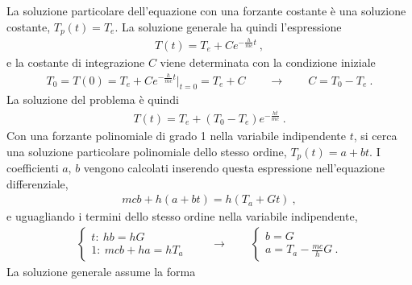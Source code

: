 \documentclass[letterpaper,10pt,italian]{jupyterBook}
\begin{document}
\sphinxAtStartPar
{} La soluzione particolare dell’equazione con una forzante costante è una soluzione costante, \(T_p(t) = T_e\). La soluzione generale ha quindi l’espressione
\begin{equation*}
\begin{split} T(t) = T_e + C e^{-\frac{h}{mc}t} \ ,\end{split}
\end{equation*}
\sphinxAtStartPar
e la costante di integrazione \(C\) viene determinata con la condizione iniziale
\begin{equation*}
\begin{split}T_0 = T(0) = T_e + C e^{-\frac{h}{mc}t} \big|_{t=0} = T_e + C \qquad \rightarrow \qquad C = T_0 - T_e \ .\end{split}
\end{equation*}
\sphinxAtStartPar
La soluzione del problema è quindi
\begin{equation*}
\begin{split}
  T(t) = T_e + ( T_0 - T_e )  e^{-\frac{ht}{mc}} \ .
\end{split}
\end{equation*}
\sphinxAtStartPar
{} Con una forzante polinomiale di grado 1 nella variabile indipendente \(t\), si cerca una soluzione particolare polinomiale dello stesso ordine, \(T_p(t) = a + b t\). I coefficienti \(a\), \(b\) vengono calcolati inserendo questa espressione nell’equazione differenziale,
\begin{equation*}
\begin{split}m c b + h (a+bt) = h(T_a + Gt ) \ ,\end{split}
\end{equation*}
\sphinxAtStartPar
e uguagliando i termini dello stesso ordine nella variabile indipendente,
\begin{equation*}
\begin{split}\begin{cases}
t: \ h b = h G            \\
1: \ m c b + h a = h T_a
\end{cases}
\qquad \rightarrow \qquad
\begin{cases}
 b = G \\
 a = T_a - \frac{mc}{h} G \ .
\end{cases}
\end{split}
\end{equation*}
\sphinxAtStartPar
La soluzione generale assume la forma
\end{document}
